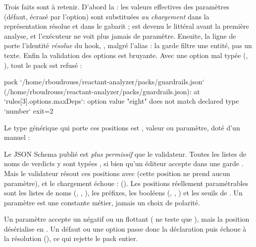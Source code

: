 Trois faits sont à retenir. D'abord la  : les valeurs effectives des paramètres (défaut, écrasé par l'option) sont substituées \emph{au chargement} dans la représentation résolue et dans le gabarit ;  est devenu le littéral \fg{} avant la première analyse, et l'exécuteur ne voit plus jamais de paramètre. Ensuite, la ligne de  porte l'identité \emph{résolue} du hook, , malgré l'alias  : la garde  filtre une entité, pas un texte. Enfin la validation des options est bruyante. Avec une option mal typée (, ), tout le pack est refusé :

\begin{sortie}
[error] pack `/home/rboudrouss/reactant-analyzer/packs/guardrails.json` (/home/rboudrouss/reactant-analyzer/packs/guardrails.json): at `rules[3].options.maxDeps`: option value "eight" does not match declared type `number`
exit=2
\end{sortie}

Le type générique qui porte ces positions est , \og valeur ou paramètre\fg{}, doté d'un  manuel :


\begin{piege}
Le JSON Schema publié est \emph{plus permissif} que le validateur. Toutes les listes de noms de verdicts y sont typées , si bien qu'un éditeur accepte  dans une garde . Mais le validateur résout ces positions avec  (\og cette position ne prend aucun paramètre\fg{}), et le chargement échoue : \og {}\fg{} (). Les positions réellement paramétrables sont les listes de noms (, , ), les préfixes, les booléens (, , ) et les seuils de . Un paramètre est une constante \og métier\fg{}, jamais un choix de polarité.
\end{piege}

\begin{piege}
Un paramètre  accepte un négatif ou un flottant ( ne teste que ), mais la position  désérialise en . Un défaut ou une option  passe donc la déclaration puis échoue à la résolution (\og {}\fg{}), ce qui rejette le pack entier.
\end{piege}

